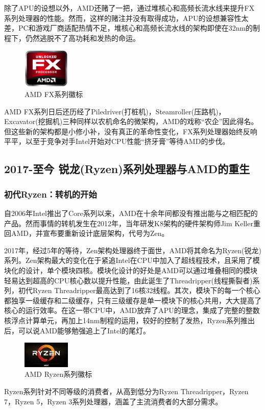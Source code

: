 \documentclass[UTF8]{ctexart}
\begin{document}
除了APU的设想以外，AMD还赌了一把，通过堆核心和高频长流水线来提升FX系列处理器的性能。然而，这样的赌注并没有取得成功，APU的设想兼容性太差，PC和游戏厂商适配热情不足，堆核心和高频长流水线的架构即使在32nm的制程下，仍然逃脱不了高功耗和发热的命运。
\begin{figure}[H]
    \begin{center}
        \includegraphics[width=0.2\textwidth]{figure/AMDFX.jpg}
        \caption{AMD FX系列徽标}
    \end{center}
\end{figure}
AMD FX系列日后还历经了Piledriver(打桩机)，Steamroller(压路机)，Excavator(挖掘机)三种同样以农机命名的微架构，AMD的戏称“农企”因此得名。但这些新的架构都是小修小补，没有真正的革命性变化，FX系列处理器始终反响平平，以至于竞争对手Intel开始对CPU性能“挤牙膏”等待AMD的步伐。


\subsection{2017-至今 锐龙(Ryzen)系列处理器与AMD的重生}
\subsubsection{初代Ryzen：转机的开始}
自2006年Intel推出了Core系列以来，AMD在十余年间都没有推出能与之相匹配的产品。然而事情的转机发生在2012年，当年研发K8架构的硬件架构师Jim Keller重回AMD，并宣布要重新设计底层架构，代号为Zen。

2017年，经过5年的等待，Zen架构处理器终于面世，AMD将其命名为Ryzen(锐龙)系列。Zen架构最大的变化在于紧追Intel在CPU中加入了超线程技术，且采用了模块化的设计，单个模块四核。模块化设计的好处是AMD可以通过堆叠相同的模块轻易达到超高的CPU核心数以提升性能，由此诞生了Threadripper(线程撕裂者)系列，初代Ryzen Threadripper最高达到了16核32线程。其次，模块下的每一个核心都独享一级缓存和二级缓存，只有三级缓存是单一模块下的核心共用，大大提高了核心的运行效率。在这一带CPU中，AMD放弃了APU的理念，集成了完整的整数核浮点计算单元，再加上14nm制程的运用，较好的控制了发热，Ryzen系列推出后，可以说AMD能够勉强追上了Intel的尾灯。
\begin{figure}[H]
    \begin{center}
        \includegraphics[width=0.2\textwidth]{figure/ryzen.jpg}
        \caption{AMD Ryzen系列徽标}
    \end{center}
\end{figure}
Ryzen系列针对不同等级的消费者，从高到低分为Ryzen Threadripper，Ryzen 7，Ryzen 5，Ryzen 3系列处理器，涵盖了主流消费者的大部分需求。
\end{document}
